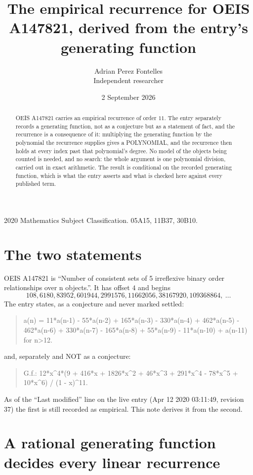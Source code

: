 \documentclass[11pt,a4paper]{article}
\title{The empirical recurrence for OEIS A147821, derived from the entry's generating function}
\author{Adrian Perez Fontelles\\ \small Independent researcher}
\date{2 September 2026}
\theoremstyle{plain}
\theoremstyle{definition}
\begin{document}
\maketitle

\begin{abstract}
OEIS A147821 carries an empirical recurrence of order $11$. The entry separately records a
generating function, not as a conjecture but as a statement of fact, and the recurrence is a
consequence of it: multiplying the generating function by the polynomial the recurrence
supplies gives a POLYNOMIAL, and the recurrence then holds at every index past that
polynomial's degree. No model of the objects being counted is needed, and no search: the
whole argument is one polynomial division, carried out in exact arithmetic. The result is
conditional on the recorded generating function, which is what the entry asserts and what is
checked here against every published term.
\end{abstract}

\noindent\small 2020 Mathematics Subject Classification. 05A15, 11B37, 30B10.\normalsize

\section{The two statements}

OEIS A147821 is ``Number of consistent sets of 5 irreflexive binary order relationships over n objects.''. It has offset $4$ and begins
\[
108, 6180, 83952, 601944, 2991576, 11662056, 38167920, 109368864,\ \dots
\]
The entry states, as a conjecture and never marked settled:
\begin{quote}
a(n) = 11*a(n-1) - 55*a(n-2) + 165*a(n-3) - 330*a(n-4) + 462*a(n-5) - 462*a(n-6) + 330*a(n-7) - 165*a(n-8) + 55*a(n-9) - 11*a(n-10) + a(n-11) for n>12.
\end{quote}
and, separately and NOT as a conjecture:
\begin{quote}
G.f.: 12*x\^{}4*(9 + 416*x + 1826*x\^{}2 + 46*x\^{}3 + 291*x\^{}4 - 78*x\^{}5 + 10*x\^{}6) / (1 - x)\^{}11.
\end{quote}
As of the ``Last modified'' line on the live entry (Apr 12 2020 03:11:49, revision 37) the first is still
recorded as empirical. This note derives it from the second.

\section{A rational generating function decides every linear recurrence}
\end{document}
